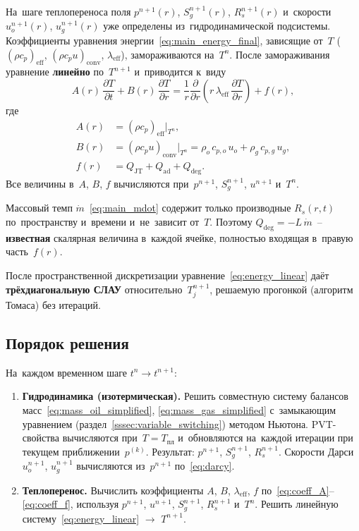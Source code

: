 \documentclass[12pt,a4paper]{article}
\newcommand{\Tpl}{T_{\text{пл}}}
\newcommand{\divr}[1]{\frac{1}{r}\frac{\partial}{\partial r}\!\left(r\,#1\right)}
\newcommand{\pdt}[1]{\frac{\partial #1}{\partial t}}
\newcommand{\pdr}[1]{\frac{\partial #1}{\partial r}}
\newcommand{\mdot}{\dot{m}}
\newcommand{\rhocpeff}{(\rho c_p)_{\mathrm{eff}}}
\newcommand{\rhocpconv}{(\rho c_p u)_{\mathrm{conv}}}
\newcommand{\leff}{\lambda_{\mathrm{eff}}}
\newcommand{\QJT}{Q_{\mathrm{JT}}}
\newcommand{\Qad}{Q_{\mathrm{ad}}}
\newcommand{\Qdeg}{Q_{\mathrm{deg}}}
\begin{document}
На~шаге теплопереноса поля $p^{n+1}(r)$, $S_g^{n+1}(r)$, $R_s^{n+1}(r)$
и~скорости $u_o^{n+1}(r)$, $u_g^{n+1}(r)$ уже определены
из~гидродинамической подсистемы. Коэффициенты уравнения
энергии~\eqref{eq:main_energy_final}, зависящие от~$T$
($\rhocpeff$, $\rhocpconv$, $\leff$), замораживаются на~$T^n$.
После замораживания уравнение \textbf{линейно} по~$T^{n+1}$
и~приводится к~виду
\begin{equation}\label{eq:energy_linear}
  A(r)\,\pdt{T} + B(r)\,\pdr{T}
  = \divr{\leff\,\pdr{T}} + f(r),
\end{equation}
где
\begin{align}
  A(r) &= \rhocpeff\big|_{T^n},
    \label{eq:coeff_A} \\
  B(r) &= \rhocpconv\big|_{T^n}
    = \rho_o\,c_{p,o}\,u_o + \rho_g\,c_{p,g}\,u_g,
    \label{eq:coeff_B} \\
  f(r) &= \QJT + \Qad + \Qdeg.
    \label{eq:coeff_f}
\end{align}
Все величины в~$A$, $B$, $f$ вычисляются при~$p^{n+1}$,
$S_g^{n+1}$, $u^{n+1}$ и~$T^n$.

Массовый темп $\mdot$~\eqref{eq:main_mdot} содержит только
производные $R_s(r,t)$ по~пространству и~времени и~не~зависит
от~$T$. Поэтому $\Qdeg = -L\,\mdot$~-- \textbf{известная}
скалярная величина в~каждой ячейке, полностью входящая
в~правую часть~$f(r)$.

После пространственной дискретизации
уравнение~\eqref{eq:energy_linear} даёт \textbf{трёхдиагональную
СЛАУ} относительно~$T_j^{n+1}$, решаемую прогонкой
(алгоритм Томаса) без итераций.


\subsection{Порядок решения}\label{ssec:order}

На~каждом временном шаге $t^n \to t^{n+1}$:

\begin{enumerate}
  \item \textbf{Гидродинамика (изотермическая).}
    Решить совместную систему балансов
    масс~\eqref{eq:mass_oil_simplified},
    \eqref{eq:mass_gas_simplified} с~замыкающим
    уравнением (раздел~\ref{sssec:variable_switching})
    методом Ньютона.
    PVT-свойства вычисляются при~$T = \Tpl$ и~обновляются
    на~каждой итерации при текущем приближении~$p^{(k)}$.
    Результат: $p^{n+1}$, $S_g^{n+1}$, $R_s^{n+1}$.
    Скорости Дарси $u_o^{n+1}$, $u_g^{n+1}$ вычисляются
    из~$p^{n+1}$ по~\eqref{eq:darcy}.

  \item \textbf{Теплоперенос.}
    Вычислить коэффициенты $A$, $B$, $\leff$, $f$
    по~\eqref{eq:coeff_A}--\eqref{eq:coeff_f},
    используя $p^{n+1}$, $u^{n+1}$, $S_g^{n+1}$, $R_s^{n+1}$
    и~$T^n$.
    Решить линейную систему~\eqref{eq:energy_linear}
    $\to$ $T^{n+1}$.
\end{enumerate}
\end{document}
